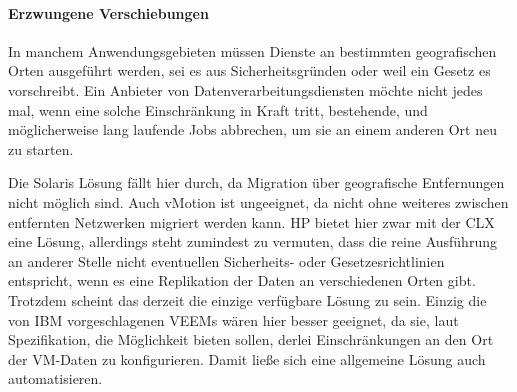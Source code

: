 \paragraph*{Erzwungene Verschiebungen}
In manchem Anwendungsgebieten müssen Dienste an bestimmten
geografischen Orten ausgeführt werden, sei es aus Sicherheitsgründen
oder weil ein Gesetz es vorschreibt. Ein Anbieter von
Datenverarbeitungsdiensten möchte nicht jedes mal, wenn eine solche
Einschränkung in Kraft tritt, bestehende, und möglicherweise lang
laufende Jobs abbrechen, um sie an einem anderen Ort neu zu starten.

Die Solaris Lösung fällt hier durch, da Migration über geografische
Entfernungen nicht möglich sind. Auch vMotion ist ungeeignet, da nicht
ohne weiteres zwischen entfernten Netzwerken migriert werden kann. HP
bietet hier zwar mit der \ac{CLX} eine Lösung, allerdings steht
zumindest zu vermuten, dass die reine Ausführung an anderer Stelle
nicht eventuellen Sicherheits- oder Gesetzesrichtlinien entspricht,
wenn es eine Replikation der Daten an verschiedenen Orten
gibt. Trotzdem scheint das derzeit die einzige verfügbare Lösung zu
sein.  Einzig die von IBM vorgeschlagenen \acp{VEEM} wären hier besser
geeignet, da sie, laut Spezifikation, die Möglichkeit bieten sollen,
derlei Einschränkungen an den Ort der VM-Daten zu konfigurieren. Damit
ließe sich eine allgemeine Lösung auch automatisieren.


